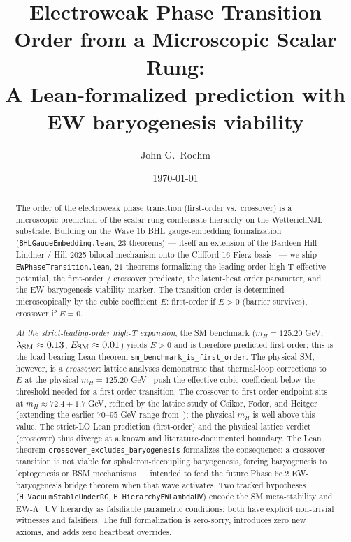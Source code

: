 \documentclass[aps,prd,twocolumn,showpacs,superscriptaddress,nofootinbib]{revtex4-2}
\begin{document}
\title{Electroweak Phase Transition Order from a Microscopic Scalar
Rung:\\
A Lean-formalized prediction with EW baryogenesis viability}

\author{John G.\ Roehm}

\date{\today}

\begin{abstract}
The order of the electroweak phase transition (first-order vs.\ crossover)
is a microscopic prediction of the scalar-rung condensate hierarchy on
the WetterichNJL substrate. Building on the Wave 1b BHL gauge-embedding
formalization (\texttt{BHLGaugeEmbedding.lean}, $23$ theorems) — itself
an extension of the Bardeen-Hill-Lindner / Hill 2025 bilocal mechanism
onto the Clifford-16 Fierz basis~\cite{BardeenHillLindner,Hill2025Redux}
— we ship \texttt{EWPhaseTransition.lean}, $21$ theorems formalizing
the leading-order high-T effective potential, the first-order /
crossover predicate, the latent-heat order parameter, and the EW
baryogenesis viability marker. The transition order is determined
microscopically by the cubic coefficient $E$: first-order if $E > 0$
(barrier survives), crossover if $E = 0$.

\textit{At the strict-leading-order high-T expansion}, the SM benchmark
($m_H = 125.20$ GeV, $\lambda_{\rm SM} \approx 0.13$, $E_{\rm SM} \approx
0.01$) yields $E > 0$ and is therefore predicted first-order; this is
the load-bearing Lean theorem \texttt{sm\_benchmark\_is\_first\_order}.
The physical SM, however, is a \textit{crossover}: lattice analyses
demonstrate that thermal-loop corrections to $E$ at the physical
$m_H = 125.20$ GeV~\cite{PDG2024} push the effective cubic coefficient
below the threshold needed for a first-order transition. The
crossover-to-first-order endpoint sits at $m_H \approx 72.4 \pm 1.7$
GeV, refined by the lattice study of Csikor, Fodor, and
Heitger~\cite{CsikorFodorHeitger1999} (extending the earlier $70$--$95$
GeV range from~\cite{KLRS1996}); the physical $m_H$ is well above
this value. The strict-LO Lean prediction (first-order) and the
physical lattice verdict (crossover) thus diverge at a known and
literature-documented boundary. The Lean theorem
\texttt{crossover\_excludes\_baryogenesis} formalizes the consequence:
a crossover transition is not viable for sphaleron-decoupling
baryogenesis, forcing baryogenesis to leptogenesis or BSM mechanisms ---
intended to feed the future Phase 6c.2 EW-baryogenesis bridge theorem
when that wave activates. Two tracked hypotheses
(\texttt{H\_VacuumStableUnderRG}, \texttt{H\_HierarchyEWLambdaUV})
encode the SM meta-stability and EW-Λ_UV hierarchy as falsifiable
parametric conditions; both have explicit non-trivial witnesses and
falsifiers. The full formalization is zero-sorry, introduces zero new
axioms, and adds zero heartbeat overrides.
\end{abstract}
\end{document}
